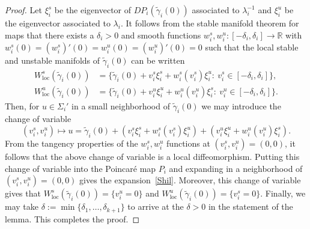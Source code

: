 \documentclass[10pt,a4paper]{amsart}
\begin{document}
\begin{proof}
Let $\xi^s_i$ be the eigenvector of $DP_i(\tilde\gamma_i(0))$ associated to $\lambda_i^{-1}$ and $\xi^u_i$ be the eigenvector associated to $\lambda_i$. It follows from the stable manifold theorem for maps that there exists a $\delta_i > 0$ and smooth functions $w^s_i,w^u_i:[-\delta_i,\delta_i] \to \mathbb{R}$ with $w^s_i(0) = (w^s_i)'(0) = w^u_i(0) = (w^u_i)'(0) = 0$ such that the local stable and unstable manifolds of $\tilde\gamma_i(0)$ can be written 
\begin{equation}
	\begin{split}
		W^s_\mathrm{loc}(\tilde\gamma_i(0)) &= \{\tilde\gamma_i(0) + v^s_i\xi^s_i + w^s_i(v^s_i)\xi^u_i:\ v^s_i \in [-\delta_i,\delta_i]\}, \\
		W^u_\mathrm{loc}(\tilde\gamma_i(0)) &= \{\tilde\gamma_i(0) + v^u_i\xi^u_i + w^u_i(v^u_i)\xi^s_i:\ v^u_i \in [-\delta_i,\delta_i]\}.
	\end{split}
\end{equation}
Then, for $u\in\Sigma_i'$ in a small neighborhood of $\tilde\gamma_i(0)$ we may introduce the change of variable
\begin{equation}
	(v^s_i,v^u_i) \mapsto u = \tilde\gamma_i(0) + (v^s_i\xi^s_i + w^s_i(v^s_i)\xi^u_i) + (v^u_i\xi^u_i + w^u_i(v^u_i)\xi^s_i). 
\end{equation}
From the tangency properties of the $w^s_i,w^u_i$ functions at $(v^s_i,v^u_i) = (0,0)$, it follows that the above change of variable is a local diffeomorphism. Putting this change of variable into the Poincar\'e map $P_i$ and expanding in a neighborhood of $(v^s_i,v^u_i) = (0,0)$ gives the expansion~\eqref{Shil}. Moreover, this change of variable gives that $W^s_\mathrm{loc}(\tilde\gamma_i(0)) = \{v^u_i = 0\}$ and $W^u_\mathrm{loc}(\tilde\gamma_i(0)) = \{v^s_i = 0\}$. Finally, we may take $\delta := \min \{\delta_1,\dots,\delta_{k+1}\}$ to arrive at the $\delta > 0$ in the statement of the lemma. This completes the proof.
\end{proof} %
\end{document}
